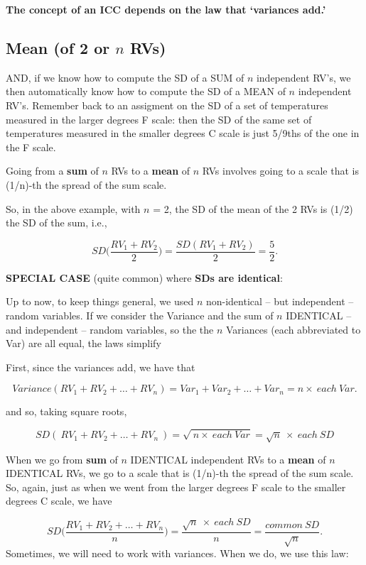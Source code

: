 \documentclass[]{book}
\begin{document}
\textbf{The concept of an ICC depends on the law that `variances add.'}

\hypertarget{mean-of-2-or-n-rvs}{%
\subsection{\texorpdfstring{Mean (of 2 or \(n\) RVs)}{Mean (of 2 or n RVs)}}\label{mean-of-2-or-n-rvs}}

AND, if we know how to compute the SD of a SUM of \(n\) independent RV's, we then automatically know how to compute the SD of a MEAN of \(n\) independent RV's. Remember back to an assigment on the SD of a set of temperatures measured in the larger degrees F scale: then the
SD of the same set of temperatures measured in the smaller degrees C scale is just 5/9ths of the one in the F scale.

Going from a \textbf{sum} of \(n\) RVs to a \textbf{mean} of \(n\) RVs involves going to a scale that is (1/n)-th the spread of the sum scale.

So, in the above example, with \(n\) = 2, the SD of the mean of the 2 RVs is (1/2) the SD of the sum, i.e.,

\[ SD\bigg(\frac{RV_1 +RV_2}{2}\bigg) = \frac{SD(RV_1+RV_2)}{2} = \frac{5}{2}.\]

\textbf{SPECIAL CASE} (quite common) where \textbf{SDs are identical}:

Up to now, to keep things general, we used \(n\) non-identical -- but independent -- random variables. If we
consider the Variance and the sum of \(n\) IDENTICAL -- and independent -- random variables, so the the \(n\) Variances (each abbreviated to Var) are all equal, the laws simplify

First, since the variances add, we have that

\[ Variance(RV_1 + RV_2 + \dots + RV_n) = Var_1 + Var_2 + \dots + Var_n = n \times \ each \ Var.\]

and so, taking square roots,

\[ SD( \ RV_1 + RV_2 + \dots + RV_n \ ) = \sqrt{ \ n \times \ each \ Var} = \sqrt{n} \ \times \ each \ SD\]

When we go from \textbf{sum} of \(n\) IDENTICAL independent RVs to a \textbf{mean} of \(n\) IDENTICAL RVs, we go to a scale that is (1/n)-th the spread of the sum scale. So, again, just as when we went from the larger degrees F scale to the smaller degrees C scale, we have

\[ SD\bigg(\frac{RV_1 + RV_2 + \dots + RV_n}{n}\bigg) = \frac{\sqrt{n} \ \times \ each \ SD}{n} = \frac{common \ SD}{\sqrt{n}} .\]
Sometimes, we will need to work with variances. When we do, we use this law:
\end{document}
